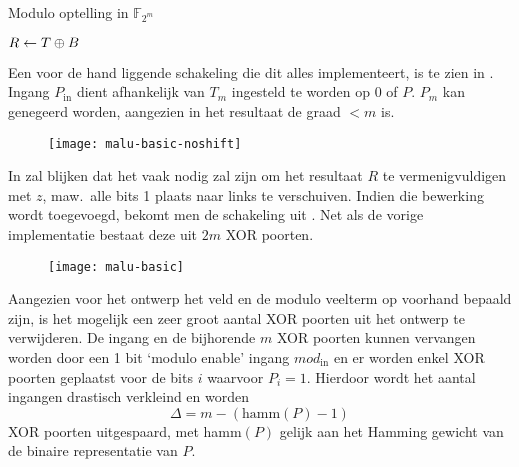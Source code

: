 \begin{algorithm}[h]
\caption{Modulo optelling in $\mathbb{F}_{2^m}$}
\label{algoritme-implementatie-malu-modulo}

	$R \leftarrow T \oplus B$\;

\end{algorithm}

Een voor de hand liggende schakeling die dit alles implementeert, is te zien in . Ingang $P_{\text{in}}$ dient afhankelijk van $T_{m}$ ingesteld te worden op $0$ of $P$. $P_{m}$ kan genegeerd worden, aangezien in het resultaat de graad $< m$ is.

\begin{figure}[h]
	\begin{center}
		\texttt{[image: malu-basic-noshift]}
		\label{figuur-implementatie-malu-basic-noshift}
	\end{center}
\end{figure}

In  zal blijken dat het vaak nodig zal zijn om het resultaat $R$ te vermenigvuldigen met $z$, maw.\ alle bits 1 plaats naar links te verschuiven. Indien die bewerking wordt toegevoegd, bekomt men de schakeling uit . Net als de vorige implementatie bestaat deze uit $2m$ XOR poorten.

\begin{figure}[h]
	\begin{center}
		\texttt{[image: malu-basic]}
		\label{figuur-implementatie-malu-basic}
	\end{center}
\end{figure}

Aangezien voor het ontwerp het veld en de modulo veelterm op voorhand bepaald zijn, is het mogelijk een zeer groot aantal XOR poorten uit het ontwerp te verwijderen. De ingang en de bijhorende $m$ XOR poorten kunnen vervangen worden door een 1 bit `modulo enable' ingang $mod_{\text{in}}$ en er worden enkel XOR poorten geplaatst voor de bits $i$ waarvoor $P_i = 1$. Hierdoor wordt het aantal ingangen drastisch verkleind en worden 
\[\Delta = m - (\text{hamm}(P) - 1)\]
XOR poorten uitgespaard, met hamm$(P)$ gelijk aan het Hamming gewicht van de binaire representatie van $P$.

